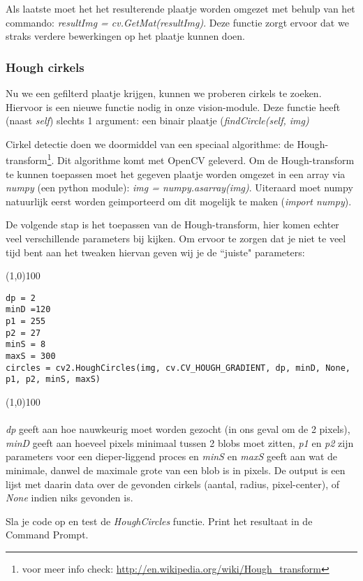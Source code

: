 \documentclass[a4paper]{article}
\begin{document}
Als laatste moet het het resulterende plaatje worden omgezet met behulp van het commando: \textit{resultImg = cv.GetMat(resultImg)}. Deze functie zorgt ervoor dat we straks verdere bewerkingen op het plaatje kunnen doen.

\subsubsection{Hough cirkels}
Nu we een gefilterd plaatje krijgen, kunnen we proberen cirkels te zoeken. Hiervoor is een nieuwe functie nodig in onze vision-module. Deze functie heeft (naast \textit{self}) slechts 1 argument: een binair plaatje (\textit{findCircle(self, img)}

Cirkel detectie doen we doormiddel van een speciaal algorithme: de Hough-transform\footnote{voor meer info check: \url{http://en.wikipedia.org/wiki/Hough_transform}}. Dit algorithme komt met OpenCV geleverd. Om de Hough-transform te kunnen toepassen moet het gegeven plaatje worden omgezet in een array via \textit{numpy} (een python module): \textit{img = numpy.asarray(img)}. Uiteraard moet numpy natuurlijk eerst worden geimporteerd om dit mogelijk te maken (\textit{import numpy}).

De volgende stap is het toepassen van de Hough-transform, hier komen echter veel verschillende parameters bij kijken. Om ervoor te zorgen dat je niet te veel tijd bent aan het tweaken hiervan geven wij je de ``juiste" parameters:

\noindent \line(1,0){100}
\begin{verbatim}
dp = 2
minD =120
p1 = 255
p2 = 27
minS = 8
maxS = 300
circles = cv2.HoughCircles(img, cv.CV_HOUGH_GRADIENT, dp, minD, None, p1, p2, minS, maxS)
\end{verbatim}
\noindent \line(1,0){100}
\\\\
\textit{dp} geeft aan hoe nauwkeurig moet worden gezocht (in ons geval om de 2 pixels), \textit{minD} geeft aan hoeveel pixels minimaal tussen 2 blobs moet zitten, \textit{p1} en \textit{p2} zijn parameters voor een dieper-liggend proces en \textit{minS} en \textit{maxS} geeft aan wat de minimale, danwel de maximale grote van een blob is in pixels.
De output is een lijst met daarin data over de gevonden cirkels (aantal, radius, pixel-center), of \textit{None} indien niks gevonden is.

Sla je code op en test de \textit{HoughCircles} functie. Print het resultaat in de Command Prompt. 
\end{document}
